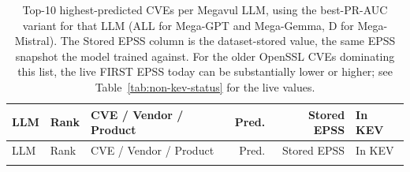 \documentclass[11pt]{article}
\begin{document}
\small
\begin{longtable}{llp{}rrl}
\caption{Top-10 highest-predicted CVEs per Megavul LLM, using the
best-PR-AUC variant for that LLM (\textsc{ALL} for Mega-GPT and
Mega-Gemma, \textsc{D} for Mega-Mistral). The Stored EPSS column is
the dataset-stored value, the same EPSS snapshot the model trained
against. For the older OpenSSL CVEs dominating this list, the live
FIRST EPSS today can be substantially lower or higher; see
Table~\ref{tab:non-kev-status} for the live values.}\\
\toprule
LLM & Rank & CVE / Vendor / Product & Pred. & Stored EPSS & In KEV \\
\midrule
\endfirsthead
\toprule
LLM & Rank & CVE / Vendor / Product & Pred. & Stored EPSS & In KEV \\
\midrule
\endhead
\bottomrule
\endfoot


\end{longtable}
\end{document}
